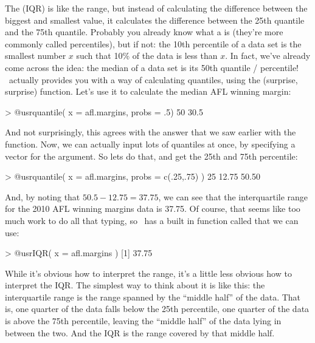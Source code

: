 The  (IQR) is like the range, but instead of calculating the difference between the biggest and smallest value, it calculates the difference between the 25th quantile and the 75th quantile. Probably you already know what a  is (they're more commonly called percentiles), but if not: the 10th percentile of a data set is the smallest number $x$ such that 10\% of the data is less than $x$. In fact, we've already come across the idea: the median of a data set is its 50th quantile / percentile! \R\ actually provides you with a way of calculating quantiles, using the (surprise, surprise)  function. Let's use it to calculate the median AFL winning margin:
\begin{rblock1}
> @usr{quantile( x = afl.margins, probs = .5)}
 50%
30.5 
\end{rblock1}
And not surprisingly, this agrees with the answer that we saw earlier with the  function. Now, we can actually input lots of quantiles at once, by specifying a vector for the  argument. So lets do that, and get the 25th and 75th percentile:
\begin{rblock1}
> @usr{quantile( x = afl.margins, probs = c(.25,.75) )}
  25%
12.75 50.50 
\end{rblock1}
And, by noting that $50.5 - 12.75 = 37.75$, we can see that the interquartile range for the 2010 AFL winning margins data is 37.75. Of course, that seems like too much work to do all that typing, so \R\ has a built in function called  that we can use:
\begin{rblock1}
> @usr{IQR( x = afl.margins )}
[1] 37.75
\end{rblock1}
While it's obvious how to interpret the range, it's a little less obvious how to interpret the IQR. The simplest way to think about it is like this: the interquartile range is the range spanned by the ``middle half'' of the data. That is, one quarter of the data falls below the 25th percentile, one quarter of the data is above the 75th percentile, leaving the ``middle half'' of the data lying in between the two. And the IQR is the range covered by that middle half.



